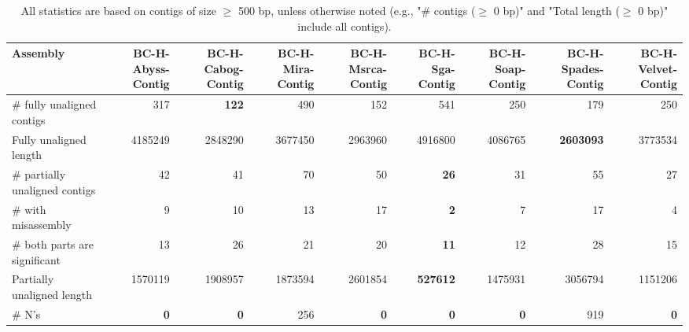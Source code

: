 \documentclass[12pt,a4paper]{article}
\begin{document}
\begin{table}[ht]
\begin{center}
\caption{All statistics are based on contigs of size $\geq$ 500 bp, unless otherwise noted (e.g., "\# contigs ($\geq$ 0 bp)" and "Total length ($\geq$ 0 bp)" include all contigs).}
\begin{tabular}{|l*{8}{|r}|}
\hline
Assembly & BC-H-Abyss-Contig & BC-H-Cabog-Contig & BC-H-Mira-Contig & BC-H-Msrca-Contig & BC-H-Sga-Contig & BC-H-Soap-Contig & BC-H-Spades-Contig & BC-H-Velvet-Contig \\ \hline
\# fully unaligned contigs & 317 & {\bf 122} & 490 & 152 & 541 & 250 & 179 & 250 \\ \hline
Fully unaligned length & 4185249 & 2848290 & 3677450 & 2963960 & 4916800 & 4086765 & {\bf 2603093} & 3773534 \\ \hline
\# partially unaligned contigs & 42 & 41 & 70 & 50 & {\bf 26} & 31 & 55 & 27 \\ \hline
\hspace{5mm}\# with misassembly & 9 & 10 & 13 & 17 & {\bf 2} & 7 & 17 & 4 \\ \hline
\hspace{5mm}\# both parts are significant & 13 & 26 & 21 & 20 & {\bf 11} & 12 & 28 & 15 \\ \hline
Partially unaligned length & 1570119 & 1908957 & 1873594 & 2601854 & {\bf 527612} & 1475931 & 3056794 & 1151206 \\ \hline
\# N's & {\bf 0} & {\bf 0} & 256 & {\bf 0} & {\bf 0} & {\bf 0} & 919 & {\bf 0} \\ \hline
\end{tabular}
\end{center}
\end{table}
\end{document}
